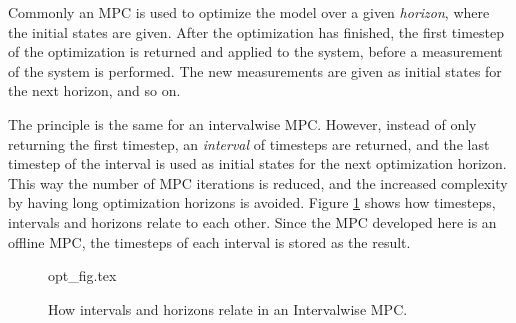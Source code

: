 Commonly an MPC is used to optimize the model over a given \textit{horizon}, where the initial states are given. After the optimization has finished, the first timestep of the optimization is returned and applied to the system, before a measurement of the system is performed. The new measurements are given as initial states for the next horizon, and so on.

The principle is the same for an intervalwise MPC. However, instead of only returning the first timestep, an \textit{interval} of timesteps are returned, and the last timestep of the interval is used as initial states for the next optimization horizon. This way the number of MPC iterations is reduced, and the increased complexity by having long optimization horizons is avoided. Figure \ref{fig:opt_fig} shows how timesteps, intervals and horizons relate to each other. Since the MPC developed here is an offline MPC, the timesteps of each interval is stored as the result.

\begin{figure}
	{opt_fig.tex}
	\caption{How intervals and horizons relate in an Intervalwise MPC.}
	\label{fig:opt_fig}
\end{figure}